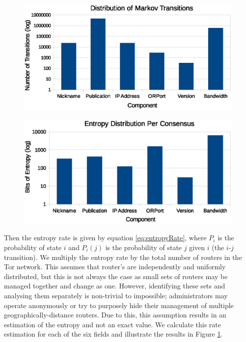 \begin{figure}
	\centering
	\begin{minipage}[t]{.47\textwidth}
  		\centering
  		\includegraphics[width=\linewidth]{analysis/MarkovTransitionDistribution.eps}
  		\label{fig:transitionCount}
	\end{minipage}%
	\hspace{0.7cm}
	\begin{minipage}[t]{.47\textwidth}
		\centering
		\includegraphics[width=\linewidth]{analysis/EntropyDistribution.eps}
		\label{fig:entropyRates}
	\end{minipage}
\end{figure}

Then the entropy rate is given by equation \ref{eq:entropyRate}, where $ P_{i} $ is the probability of state $ i $ and $ P_{i}(j) $ is the probability of state $ j $ given $ i $ (the $ i $-$ j $ transition). We multiply the entropy rate by the total number of routers in the Tor network. This assumes that router's are independently and uniformly distributed, but this is not always the case as small sets of routers may be managed together and change as one. However, identifying these sets and analysing them separately is non-trivial to impossible; administrators may operate anonymously or try to purposely hide their management of multiple geographically-distance routers. Due to this, this assumption results in an estimation of the entropy and not an exact value. We calculate this rate estimation for each of the six fields and illustrate the results in Figure \ref{fig:entropyRates}.


